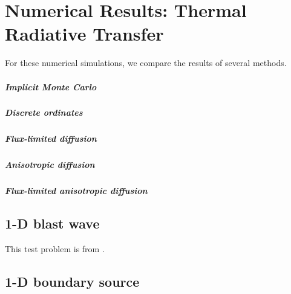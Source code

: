 
\chapter{Numerical Results: Thermal Radiative
Transfer}\label{chap:trtNumericalResults}

For these numerical simulations, we compare the results of several methods.

\paragraph{Implicit Monte Carlo}

\paragraph{Discrete ordinates}

\paragraph{Flux-limited diffusion}

\paragraph{Anisotropic diffusion}

\paragraph{Flux-limited anisotropic diffusion}

\section{1-D blast wave}
This test problem is from \cite{Rau2005,Ols2007}.

\section{1-D boundary source}

